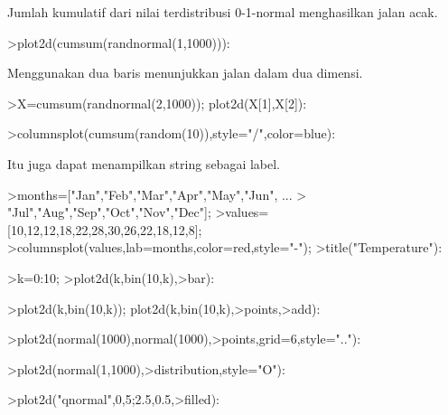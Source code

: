 \documentclass{article}
\begin{document}
\begin{eulernotebook}
\begin{eulercomment}
\begin{eulercomment}
\begin{eulercomment}
\begin{eulercomment}
\begin{eulercomment}
Jumlah kumulatif dari nilai terdistribusi 0-1-normal menghasilkan
jalan acak.
\end{eulercomment}
\begin{eulerprompt}
>plot2d(cumsum(randnormal(1,1000))):
\end{eulerprompt}
\begin{eulercomment}
Menggunakan dua baris menunjukkan jalan dalam dua dimensi.
\end{eulercomment}
\begin{eulerprompt}
>X=cumsum(randnormal(2,1000)); plot2d(X[1],X[2]):
\end{eulerprompt}
\begin{eulerprompt}
>columnsplot(cumsum(random(10)),style="/",color=blue):
\end{eulerprompt}
\begin{eulercomment}
Itu juga dapat menampilkan string sebagai label.
\end{eulercomment}
\begin{eulerprompt}
>months=["Jan","Feb","Mar","Apr","May","Jun", ...
>  "Jul","Aug","Sep","Oct","Nov","Dec"];
>values=[10,12,12,18,22,28,30,26,22,18,12,8];
>columnsplot(values,lab=months,color=red,style="-");
>title("Temperature"):
\end{eulerprompt}
\begin{eulerprompt}
>k=0:10;
>plot2d(k,bin(10,k),>bar):
\end{eulerprompt}
\begin{eulerprompt}
>plot2d(k,bin(10,k)); plot2d(k,bin(10,k),>points,>add):
\end{eulerprompt}
\begin{eulerprompt}
>plot2d(normal(1000),normal(1000),>points,grid=6,style=".."):
\end{eulerprompt}
\begin{eulerprompt}
>plot2d(normal(1,1000),>distribution,style="O"):
\end{eulerprompt}
\begin{eulerprompt}
>plot2d("qnormal",0,5;2.5,0.5,>filled):
\end{eulerprompt}

\end{eulercomment}
\end{eulercomment}
\end{eulercomment}
\end{eulercomment}
\end{eulernotebook}
\end{document}
